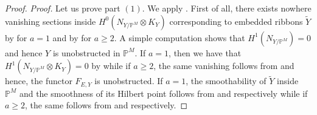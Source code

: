 \documentclass[11pt,twoside]{amsart}
\theoremstyle{plain}
\numberwithin{equation}{section}
\theoremstyle{definition}
\begin{document}
\begin{proof}
\noindent\textit{Proof.} Let us prove part $(1)$. We apply \cite[Theorem $2.10$]{BGM24}. First of all, there exists nowhere vanishing sections inside $H^0(N_{Y/\mathbb{P}^M} \otimes K_Y)$ corresponding to embedded ribbons $\widetilde{Y}$ by \cite[Theorem $1.7$]{GP97} for $a = 1$ and  by \cite[Theorem $3.1$]{BMR21} for $a \geq 2$. A simple computation  shows that $H^1(N_{Y/\mathbb{P}^M}) = 0$ and hence $Y$ is unobstructed in $\mathbb{P}^M$. If $a = 1$, then we have that $H^1(N_{Y/\mathbb{P}^M} \otimes K_Y) = 0$ by \cite[Theorem $1.7$]{GP97} while if $a \geq 2$, the same vanishing follows from \cite[Lemma $2.7$, $(2)$]{BMR21} and hence, the functor $F_{E, Y}$ is unobstructed. If $a = 1$, the smoothability of $\widetilde{Y}$ inside $\mathbb{P}^M$ and the smoothness of its Hilbert point follows from \cite[Corollary $2.9$]{GGP13} and \cite[Theorem $4.1$]{GP97} respectively while if $a \geq 2$, the same follows from \cite[Theorem $4.1$]{BMR21} and \cite[Theorem $5.1$]{BMR21} respectively. 


\end{proof}
\end{document}
